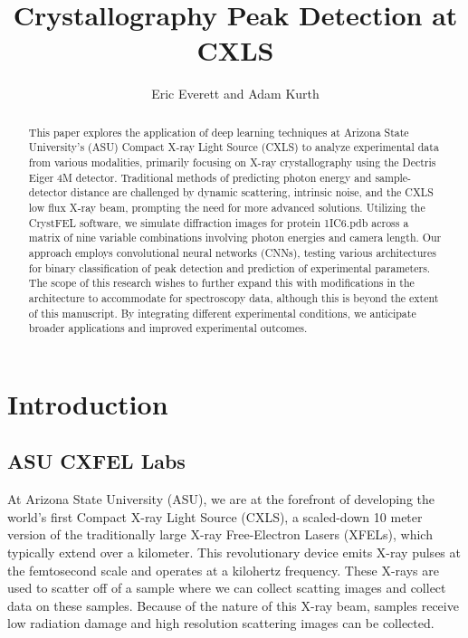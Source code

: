 \documentclass[12pt]{article}
\title{Crystallography Peak Detection at CXLS}
\author{Eric Everett and Adam Kurth}
\begin{document}
\maketitle

\begin{abstract}

This paper explores the application of deep learning techniques at Arizona State University's (ASU) Compact X-ray Light Source (CXLS) to analyze experimental data from various modalities, primarily focusing on X-ray crystallography using the Dectris Eiger 4M detector. Traditional methods of predicting photon energy and sample-detector distance are challenged by dynamic scattering, intrinsic noise, and the CXLS low flux X-ray beam, prompting the need for more advanced solutions. Utilizing the CrystFEL\cite{crystfel} software, we simulate diffraction images for protein 1IC6.pdb across a matrix of nine variable combinations involving photon energies and camera length. Our approach employs convolutional neural networks (CNNs), testing various architectures for binary classification of peak detection and prediction of experimental parameters. The scope of this research wishes to further expand this with modifications in the architecture to accommodate for spectroscopy data, although this is beyond the extent of this manuscript. By integrating different experimental conditions, we anticipate broader applications and improved experimental outcomes.

\end{abstract}

\section{Introduction}

\subsection{ASU CXFEL Labs}

At Arizona State University (ASU), we are at the forefront of developing the world's first Compact X-ray Light Source (CXLS), a scaled-down 10 meter version of the traditionally large X-ray Free-Electron Lasers (XFELs), which typically extend over a kilometer. This revolutionary device emits X-ray pulses at the femtosecond scale and operates at a kilohertz frequency. These X-rays are used to scatter off of a sample where we can collect scatting images and collect data on these samples. Because of the nature of this X-ray beam, samples receive low radiation damage and high resolution scattering images can be collected.
\end{document}
